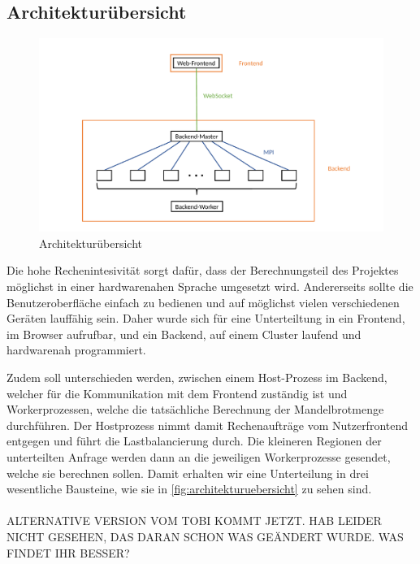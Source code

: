 \subsection{Architekturübersicht}
\begin{figure}
	\centering
	\includegraphics[width=0.98\linewidth]{img/Implementierung/Kommunikation.pdf}
	\caption{Architekturübersicht}
	\label{fig:architekturuebersicht}
\end{figure}

Die hohe Rechenintesivität sorgt dafür, dass der Berechnungsteil des Projektes möglichst in einer
hardwarenahen Sprache umgesetzt wird.
Andererseits sollte die Benutzeroberfläche einfach zu bedienen und auf möglichst vielen verschiedenen Geräten lauffähig sein.
Daher wurde sich für eine Unterteiltung in ein Frontend, im Browser aufrufbar, und ein Backend, auf einem Cluster
laufend und hardwarenah programmiert.

Zudem soll unterschieden werden, zwischen einem Host-Prozess im Backend, welcher für die Kommunikation mit dem
Frontend zuständig ist und Workerprozessen, welche die tatsächliche Berechnung der Mandelbrotmenge durchführen.
Der Hostprozess nimmt damit Rechenaufträge vom Nutzerfrontend entgegen und führt die Lastbalancierung durch.
Die kleineren Regionen der unterteilten Anfrage werden dann an die jeweiligen Workerprozesse gesendet, welche sie berechnen sollen.
Damit erhalten wir eine Unterteilung in drei wesentliche Bausteine, wie sie in \autoref{fig:architekturuebersicht} zu sehen sind.
\\ \\
ALTERNATIVE VERSION VOM TOBI KOMMT JETZT. HAB LEIDER NICHT GESEHEN, DAS DARAN SCHON WAS GEÄNDERT WURDE. WAS FINDET IHR BESSER?
\\ \\
